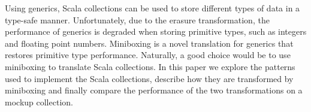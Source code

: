 Using generics, Scala collections can be used to store different types of data in a type-safe manner. Unfortunately, due to the erasure transformation, the performance of generics is degraded when storing primitive types, such as integers and floating point numbers. Miniboxing is a novel translation for generics that restores primitive type performance. Naturally, a good choice would be to use miniboxing to translate Scala collections. In this paper we explore the patterns used to implement the Scala collections, describe how they are transformed by miniboxing and finally compare the performance of the two transformations on a mockup collection.